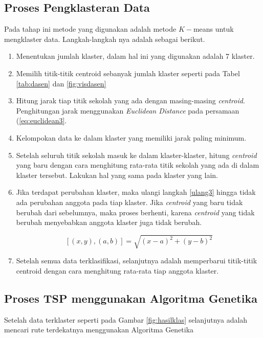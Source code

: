 \subsection{Proses Pengklasteran Data}

Pada tahap ini metode yang digunakan adalah metode $K-$means untuk mengklaster data. Langkah-langkah nya adalah sebagai berikut.

\begin{enumerate}
	\item Menentukan jumlah klaster, dalam hal ini yang digunakan adalah 7 klaster.
	\item Memilih titik-titik centroid sebanyak jumlah klaster seperti pada Tabel \ref{tab:dasen} dan \ref{fig:visdasen}
	\item \label{ulang3} Hitung jarak tiap titik sekolah yang ada dengan masing-masing \textit{centroid}. Penghitungan jarak menggunakan \textit{Euclidean Distance} pada persamaan (\ref{eq:euclidean3}.
	\item Kelompokan data ke dalam klaster yang memiliki jarak paling minimum.
	\item Setelah seluruh titik sekolah masuk ke dalam klaster-klaster, hitung \textit{centroid} yang baru dengan cara menghitung rata-rata titik sekolah yang ada di dalam klaster tersebut. Lakukan hal yang sama pada klaster yang lain.
	\item Jika terdapat perubahan klaster, maka ulangi langkah \ref{ulang3} hingga tidak ada perubahan anggota pada tiap klaster. Jika \textit{centroid} yang baru tidak berubah dari sebelumnya, maka proses berhenti, karena \textit{centroid} yang tidak berubah menyebabkan anggota klaster juga tidak berubah.
	
	\begin{equation}
	\left[ \left( x,y \right) ,\left( a,b \right)\right]=\sqrt{\left( x-a \right)^{2}+\left( y-b \right)^{2}}
	\label{eq:euclidean3}
	\end{equation}
	
	\item Setelah semua data terklasifikasi, selanjutnya adalah memperbarui titik-titik centroid dengan cara menghitung rata-rata tiap anggota klaster.
\end{enumerate}

\subsection{Proses TSP menggunakan Algoritma Genetika}

Setelah data terklaster seperti pada Gambar \ref{fig:hasilklas} selanjutnya adalah mencari rute terdekatnya menggunakan Algoritma Genetika

